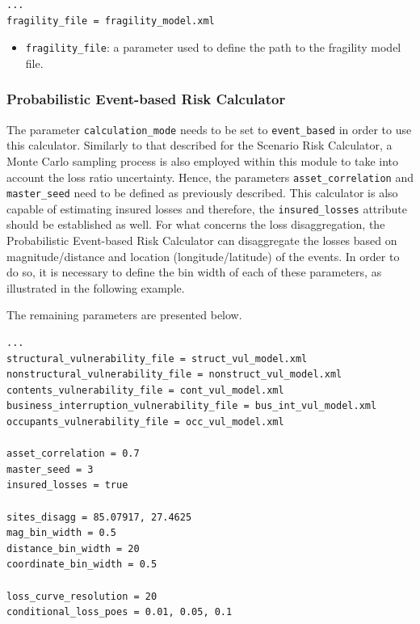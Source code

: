\begin{Verbatim}[frame=single, commandchars=\\\{\}, samepage=true]
...
fragility_file = fragility_model.xml
\end{Verbatim}

\begin{itemize}
\item  \Verb+fragility_file+: a parameter used to define the path to the \gls{fragility model} file.
\end{itemize}

\subsubsection{Probabilistic Event-based Risk Calculator}
The parameter \Verb+calculation_mode+ needs to be set to \Verb+event_based+ in order to use this calculator. Similarly to that described for the Scenario Risk Calculator, a Monte Carlo sampling process is also employed within this module to take into account the loss ratio uncertainty. Hence, the parameters \Verb+asset_correlation+ and \Verb+master_seed+ need to be defined as previously described. This calculator is also capable of estimating insured losses and therefore, the \Verb+insured_losses+ attribute should be established as well.
For what concerns the loss disaggregation, the Probabilistic Event-based Risk Calculator can disaggregate the losses based on magnitude/distance and location (longitude/latitude) of the events. In order to do so, it is necessary to define the bin width of each of these parameters, as illustrated in the following example.

 The remaining parameters are presented below.

\begin{Verbatim}[frame=single, commandchars=\\\{\}, samepage=true]
...
structural_vulnerability_file = struct_vul_model.xml
nonstructural_vulnerability_file = nonstruct_vul_model.xml
contents_vulnerability_file = cont_vul_model.xml
business_interruption_vulnerability_file = bus_int_vul_model.xml
occupants_vulnerability_file = occ_vul_model.xml

asset_correlation = 0.7
master_seed = 3
insured_losses = true

sites_disagg = 85.07917, 27.4625
mag_bin_width = 0.5
distance_bin_width = 20
coordinate_bin_width = 0.5

loss_curve_resolution = 20
conditional_loss_poes = 0.01, 0.05, 0.1
\end{Verbatim}


